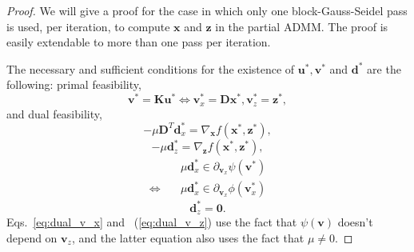 \documentclass[10pt,twocolumn,twoside]{IEEEtran}
\newcommand{\x}{\mathbf{x}} %
\newcommand{\z}{\mathbf{z}} %
\newcommand{\vs}{\mathbf{v}} %
\newcommand{\dv}{\mathbf{d}} %
\newcommand{\D}{\mathbf{D}} %
\newcommand{\K}{\mathbf{K}} %
\newcommand{\uu}{\mathbf{u}} %
\begin{document}
\begin{proof}

	We will give a proof for the case in which only one block-Gauss-Seidel pass is used, per iteration, to compute $\x$ and $\z$ in the partial ADMM. The proof is easily extendable to more than one pass per iteration.

	The necessary and sufficient conditions for the existence of $\uu^*, \vs^*$ and $\dv^*$ are the following: primal feasibility,
	\begin{equation} \label{eq:primal}
	\vs^* = \K \uu^* \Leftrightarrow \vs_x^* = \D \x^*, \vs_z^* = \z^*,
	\end{equation}
	and dual feasibility,
	\begin{equation} \label{eq:dual_x}
	- \mu \D^{T} \dv_x^* = \nabla_{\x} f(\x^*, \z^*),
	\end{equation}
	\begin{equation} \label{eq:dual_z}
	- \mu \dv_z^* = \nabla_\z f(\x^*, \z^*),
	\end{equation}
	\begin{align}
	&\mu \dv_x^* \in \partial_{\vs_x} \psi(\vs^*) \nonumber \\
	\Leftrightarrow \quad &\mu \dv_x^* \in \partial_{\vs_x} \phi(\vs_x^*)  \label{eq:dual_v_x}
	\end{align}
	\begin{equation} \label{eq:dual_v_z}
	\dv_z^* = \mathbf{0}.
	\end{equation}
	Eqs.~\eqref{eq:dual_v_x} and ~(\ref{eq:dual_v_z}) use the fact that $\psi(\vs)$ doesn't depend on $\vs_z$, and the latter equation also uses the fact that $\mu \neq 0$.




\end{proof}
\end{document}
